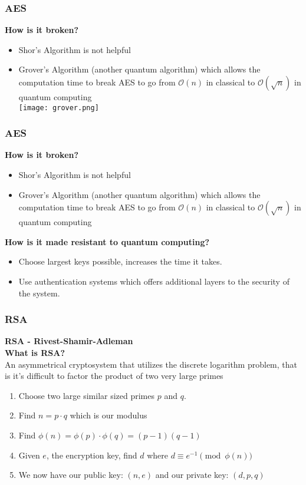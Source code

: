 \documentclass{beamer}
\begin{document}
\begin{frame}
\frametitle{AES}
{\bf How is it broken?}\\
\begin{itemize}
\item
Shor's Algorithm is not helpful\\
\pause
\item
Grover's Algorithm (another quantum algorithm) which allows the computation time to break AES to go from $\mathcal{O}(n)$ in classical to $\mathcal{O}(\sqrt{n})$ in quantum computing\\
\texttt{[image: grover.png]}
\end{itemize}
\end{frame}
\begin{frame}
\frametitle{AES}
{\bf How is it broken?}\\
\begin{itemize}
\item
Shor's Algorithm is not helpful\\
\item
Grover's Algorithm (another quantum algorithm) which allows the computation time to break AES to go from $\mathcal{O}(n)$ in classical to $\mathcal{O}(\sqrt{n})$ in quantum computing\\
\end{itemize}
\vspace{0.1in}
{\bf How is it made resistant to quantum computing?}\\
\begin{itemize}
\item
Choose largest keys possible, increases the time it takes. 
\item
Use authentication systems which offers additional layers to the security of the system.
\end{itemize}
\end{frame}

\begin{frame}
\frametitle{RSA}
{\bf RSA - Rivest-Shamir-Adleman}\\
{\bf What is RSA?}\\
An asymmetrical cryptosystem that utilizes the discrete logarithm problem, that is it's difficult to factor the product of two very large primes\\
\begin{enumerate}
    \item Choose two large similar sized primes $p$ and $q$.
    \item Find $n=p\cdot q$ which is our modulus
    \item Find $\phi(n)=\phi(p)\cdot\phi(q)=(p-1)(q-1)$
    \item Given $e$, the encryption key, find $d$ where $d\equiv e^{-1}\pmod{\phi(n)}$
    \item We now have our public key: $(n,e)$ and our private key: $(d,p,q)$
\end{enumerate}\\
\end{frame}
\end{document}
